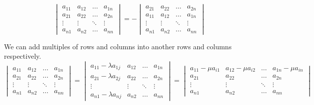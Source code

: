 \documentclass{huhtakm-template-book}
\begin{document}
\begin{defn}
\begin{equation*}
\begin{vmatrix}
            a_{11} & a_{12} & \hdots & a_{1n}\\
            a_{21} & a_{22} & \hdots & a_{2n}\\
            \vdots & \vdots & \ddots & \vdots\\
            a_{n1} & a_{n2} & \hdots & a_{nn}
        \end{vmatrix}=-\begin{vmatrix}
            a_{21} & a_{22} & \hdots & a_{2n}\\
            a_{11} & a_{12} & \hdots & a_{1n}\\
            \vdots & \vdots & \ddots & \vdots\\
            a_{n1} & a_{n2} & \hdots & a_{nn}
        \end{vmatrix}
    \end{equation*}
\end{defn}
\newpage
\begin{lem}
    We can add multiples of rows and columns into another rows and columns respectively.
    \begin{equation*}
        \begin{vmatrix}
            a_{11} & a_{12} & \hdots & a_{1n}\\
            a_{21} & a_{22} & \hdots & a_{2n}\\
            \vdots & \vdots & \ddots & \vdots\\
            a_{n1} & a_{n2} & \hdots & a_{nn}
        \end{vmatrix}=\begin{vmatrix}
            a_{11}-\lambda a_{1j} & a_{12} & \hdots & a_{1n}\\
            a_{21}-\lambda a_{2j} & a_{22} & \hdots & a_{2n}\\
            \vdots & \vdots & \ddots & \vdots\\
            a_{n1}-\lambda a_{nj} & a_{n2} & \hdots & a_{nn}
        \end{vmatrix}=\begin{vmatrix}
            a_{11}-\mu a_{i1} & a_{12}-\mu a_{i2} & \hdots & a_{1n}-\mu a_{in}\\
            a_{21} & a_{22} & \hdots & a_{2n}\\
            \vdots & \vdots & \ddots & \vdots\\
            a_{n1} & a_{n2} & \hdots & a_{nn}
        \end{vmatrix}
    \end{equation*}
\end{lem}
\end{document}
